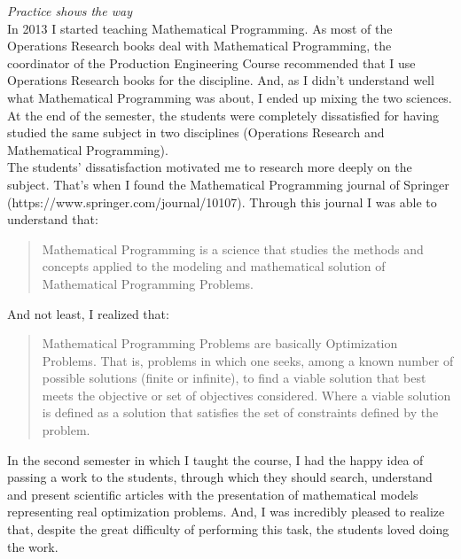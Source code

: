 \documentclass{book}
\begin{document}
\emph{Practice shows the way} \\

In 2013 I started teaching Mathematical Programming. As most of the Operations Research books deal with Mathematical Programming, the coordinator of the Production Engineering Course recommended that I use Operations Research books for the discipline. And, as I didn't understand well what Mathematical Programming was about, I ended up mixing the two sciences. At the end of the semester, the students were completely dissatisfied for having studied the same subject in two disciplines (Operations Research and Mathematical Programming). \\

The students' dissatisfaction motivated me to research more deeply on the subject. That's when I found the Mathematical Programming journal of Springer (https://www.springer.com/journal/10107). Through this journal I was able to understand that: \\

\begin{quotation}
\noindent Mathematical Programming is a science that studies the methods and concepts applied to the modeling and mathematical solution of Mathematical Programming Problems. \\
\end{quotation}

And not least, I realized that: \\

\begin{quotation}

\noindent Mathematical Programming Problems are basically Optimization Problems. That is, problems in which one seeks, among a known number of possible solutions (finite or infinite), to find a viable solution that best meets the objective or set of objectives considered. Where a viable solution is defined as a solution that satisfies the set of constraints defined by the problem. \\

\end{quotation}

In the second semester in which I taught the course, I had the happy idea of passing a work to the students, through which they should search, understand and present scientific articles with the presentation of mathematical models representing real optimization problems. And, I was incredibly pleased to realize that, despite the great difficulty of performing this task, the students loved doing the work. \\
\end{document}
